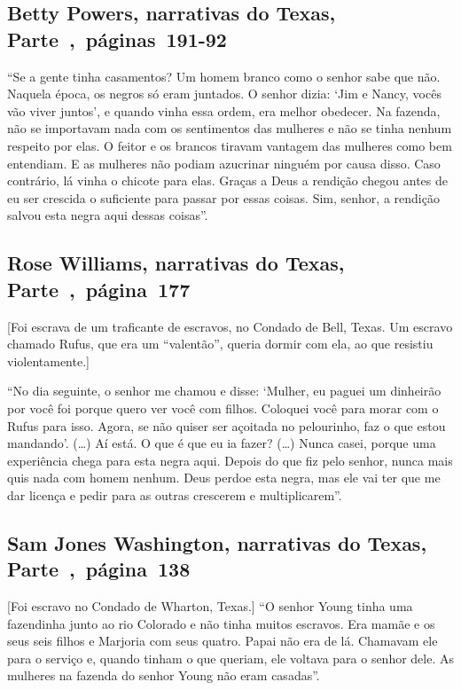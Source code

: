 \subsection{Betty Powers, narrativas do Texas, Parte~,~páginas~191-92}
\label{ref212}

``Se a gente tinha casamentos? Um homem branco como o senhor sabe que
não. Naquela época, os negros só eram juntados. O senhor dizia: `Jim e
Nancy, vocês vão viver juntos', e quando vinha essa ordem, era melhor
obedecer. Na fazenda, não se importavam nada com os sentimentos das
mulheres e não se tinha nenhum respeito por elas. O feitor e os brancos
tiravam vantagem das mulheres como bem entendiam. E as mulheres não
podiam azucrinar ninguém por causa disso. Caso contrário, lá vinha o
chicote para elas. Graças a Deus a rendição chegou antes de eu ser
crescida o suficiente para passar por essas coisas. Sim, senhor, a
rendição salvou esta negra aqui dessas coisas''.

\subsection{Rose Williams, narrativas do Texas, Parte~,~página~177}

{[}Foi escrava de um traficante de escravos, no Condado de Bell,
Texas. Um escravo chamado Rufus, que era um ``valentão'', queria dormir com
ela, ao que resistiu violentamente.{]}

``No dia seguinte, o senhor me chamou e disse: `Mulher, eu paguei um
dinheirão por você foi porque quero ver você com filhos. Coloquei você
para morar com o Rufus para isso. Agora, se não quiser ser açoitada no
pelourinho, faz o que estou mandando'. (\ldots{}) Aí está. O que é que
eu ia fazer? (\ldots{}) Nunca casei, porque uma experiência chega para
esta negra aqui. Depois do que fiz pelo senhor, nunca mais quis nada com
homem nenhum. Deus perdoe esta negra, mas ele vai ter que me dar licença
e pedir para as outras crescerem e multiplicarem''.

\subsection{Sam Jones Washington, narrativas do Texas, Parte~,~página~138}
\label{ref281}

{[}Foi escravo no Condado de Wharton, Texas.{]} ``O senhor Young tinha uma fazendinha junto ao rio Colorado e não tinha
muitos escravos. Era mamãe e os seus seis filhos e Marjoria com seus
quatro. Papai não era de lá. Chamavam ele para o serviço e, quando
tinham o que queriam, ele voltava para o senhor dele. As mulheres na
fazenda do senhor Young não eram casadas''.

